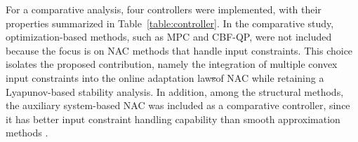 \documentclass[letterpaper, journal]{IEEEtran}
\providecommand{\DIFdel}[1]{{\protect\color{red}\sout{#1}}} %
\providecommand{\DIFdelbegin}{} %
\providecommand{\DIFdelend}{} %
\begin{document}
\hfill


\DIFdelbegin %

\DIFdelend For a comparative analysis, four controllers were implemented, with their properties summarized in Table~\ref{table:controller}.
In the comparative study, optimization-based methods, such as MPC and CBF-QP, were not included because the focus is on NAC methods that handle input constraints.
This choice isolates the proposed contribution, namely the integration of multiple convex input constraints into the online adaptation law\DIFdelbegin \DIFdel{s}\DIFdelend  of NAC while retaining a Lyapunov-based stability analysis.
In addition, among the structural methods, the auxiliary system-based NAC was included as a comparative controller, since it has better input constraint handling capability than smooth approximation methods \cite{Min:2021aa}.
\end{document}

